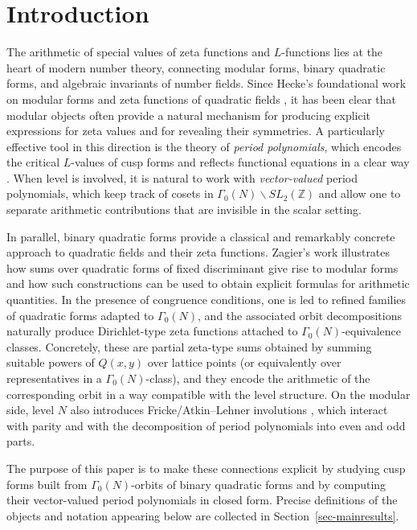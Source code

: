 \documentclass[12pt]{amsart}
\numberwithin{equation}{section}
\theoremstyle{definition}
\begin{document}
\maketitle
\section{Introduction}\label{sec-intro}


The arithmetic of special values of zeta functions and $L$-functions lies at the heart of modern number theory, connecting modular forms, binary quadratic forms, and algebraic invariants of number fields.  Since Hecke’s foundational work on modular forms and zeta functions of quadratic fields \cite{Hecke}, it has been clear that modular objects often provide a natural mechanism for producing explicit expressions for zeta values and for revealing their symmetries.  A particularly effective tool in this direction is the theory of \emph{period polynomials}, which encodes the critical $L$-values of cusp forms and reflects functional equations in a clear way \cite{ManinPeriods}.  When level is involved, it is natural to work with \emph{vector-valued} period polynomials, which keep track of cosets in $\Gamma_0(N)\backslash SL_2(\mathbb{Z})$ and allow one to separate arithmetic contributions that are invisible in the scalar setting.

In parallel, binary quadratic forms provide a classical and remarkably concrete approach to quadratic fields and their zeta functions.  Zagier’s work \cite{ZagierZetaQuadratic} illustrates how sums over quadratic forms of fixed discriminant give rise to modular forms and how such constructions can be used to obtain explicit formulas for arithmetic quantities.  In the presence of congruence conditions, one is led to refined families of quadratic forms adapted to $\Gamma_0(N)$, and the associated orbit decompositions naturally produce Dirichlet-type zeta functions attached to $\Gamma_0(N)$-equivalence classes.  Concretely, these are partial zeta-type sums obtained by summing suitable powers of $Q(x,y)$ over lattice points (or equivalently over representatives in a $\Gamma_0(N)$-class), and they encode the arithmetic of the corresponding orbit in a way compatible with the level structure. On the modular side, level $N$ also introduces Fricke/Atkin--Lehner involutions \cite{AtkinLehner}, which interact with parity and with the decomposition of period polynomials into even and odd parts. 

The purpose of this paper is to make these connections explicit by studying cusp forms built from $\Gamma_0(N)$-orbits of binary quadratic forms and by computing their vector-valued period polynomials in closed form.
Precise definitions of the objects and notation appearing below are collected in Section~\ref{sec-mainresults}.
\end{document}
